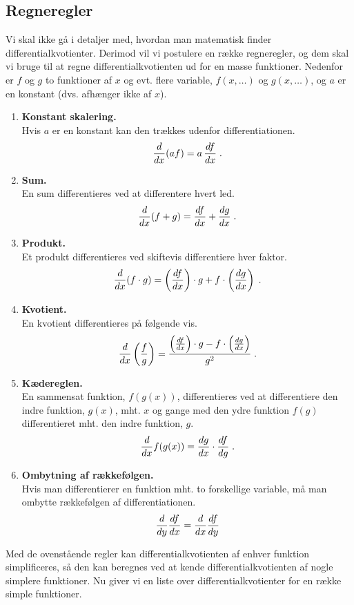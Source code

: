 \subsection{Regneregler}
Vi skal ikke gå i detaljer med, hvordan man matematisk finder
differentialkvotienter. Derimod vil vi postulere en række regneregler,
og dem skal vi bruge til at regne differentialkvotienten ud for en
masse funktioner. Nedenfor er $f$ og $g$ to funktioner af $x$ og
evt. flere variable, $f(x,\dots)$ og $g(x,\dots)$, og $a$ er en
konstant (dvs. afhænger ikke af $x$).

\begin{enumerate}
\item\label{itm:d-skalering} \textbf{Konstant skalering.}\\
  Hvis $a$ er en konstant kan den trækkes udenfor differentiationen.
  \[
  \dl{(a f)}{x} = a \, \d{f}{x} \; .
  \]
\item\label{itm:d-sum} \textbf{Sum.}\\
  En sum differentieres ved at differentere hvert led.
  \[
  \dl{(f+g)}{x} = \d{f}{x} + \d{g}{x} \; .
  \]
\item\label{itm:d-produkt} \textbf{Produkt.}\\
  Et produkt differentieres ved skiftevis differentiere hver faktor.
  \[
  \dl{(f \cdot g)}{x} =
  \left(\d{f}{x}\right) \cdot g + f \cdot \left(\d{g}{x}\right) \; .
  \]
\item\label{itm:d-kvotient} \textbf{Kvotient.}\\
  En kvotient differentieres på følgende vis.
  \[
  \dl{\left( \frac{f}{g} \right)}{x}
  = \frac{\left(\d{f}{x}\right)
    \cdot g - f \cdot \left(\d{g}{x}\right)}{g^2} \; .
  \]
\item\label{itm:d-kaederegel} \textbf{Kædereglen.}\\
  En sammensat funktion, $f(g(x))$, differentieres ved at
  differentiere den indre funktion, $g(x)$, mht. $x$ og gange med den
  ydre funktion $f(g)$ differentieret mht. den indre funktion, $g$.
  \[
  \dl{f(g(x))}{x} = \d{g}{x} \cdot \d{f}{g} \; .
  \]
\item\label{itm:d-kommutation} \textbf{Ombytning af rækkefølgen.}\\
  Hvis man differentierer en funktion mht. to forskellige variable, må
  man ombytte rækkefølgen af differentiationen.
  \[
  \dl{\d{f}{x}}{y} = \dl{\d{f}{y}}{x}
  \]
\end{enumerate}

Med de ovenstående regler kan differentialkvotienten af enhver
funktion simplificeres, så den kan beregnes ved at kende
differentialkvotienten af nogle simplere funktioner. Nu giver vi en
liste over differentialkvotienter for en række simple funktioner.

